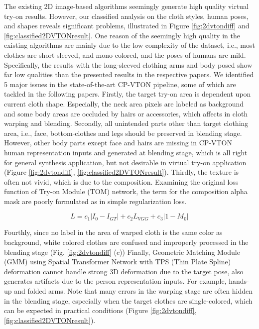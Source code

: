 The existing 2D image-based algorithms seemingly generate high quality virtual try-on results. However, our classified analysis on the cloth styles, human poses, and shapes reveals significant problems, illustrated in Figure \ref{fig:2dvtondiff} and \ref{fig:classified2DVTONresult}. One reason of the seemingly high quality in the existing algorithms are mainly due to the low complexity of the dataset, i.e., most clothes are short-sleeved, and mono-colored, and the poses of humans are mild. Specifically, the results with the long-sleeved clothing arms and body posed show far low qualities than the presented results in the respective papers\cite{Han2017VITONAI,Wang2018TowardCI}. We identified 5 major issues in the state-of-the-art CP-VTON\cite{Wang2018TowardCI} pipeline, some of which are tackled in the following papers\cite{Sun2019ImageBasedVT,Yu_2019_ICCV}. Firstly, the target try-on area is dependent upon current cloth shape. Especially, the neck area pixels are labeled as background and some body areas are occluded by hairs or accessories, which affects in cloth warping and blending. Secondly, all unintended parts other than target clothing area, i.e., face, bottom-clothes and legs should be preserved in blending stage. However, other body parts except face and hairs are missing in CP-VTON\cite{Wang2018TowardCI} human representation inputs and generated at blending stage, which is all right for general synthesis application, but not desirable in virtual try-on application (Figure \ref{fig:2dvtondiff}, \ref{fig:classified2DVTONresult}). Thirdly, the texture is often not vivid, which is due to the composition. Examining the original loss function of Try-on Module (TOM) network, the term for the composition alpha mask are poorly formulated as in simple regularization loss.   

\begin{equation}
L = c_1 | I_0-I_{GT} |+  c_2 L_{VGG}+c_3 |1-M_0 |        
\end{equation} 

Fourthly, since no label in the area of warped cloth is the same color as background, white colored clothes are confused and improperly processed in the blending stage (Fig. \ref{fig:2dvtondiff} (c))
Finally, Geometric Matching Module (GMM) using Spatial Transformer Network\cite{JaderbergSZK15} with TPS (Thin Plate Spline)\cite{Bookstein1989PrincipalWT} deformation cannot handle strong 3D deformation due to the target pose, also  generates artifacts due to the person representation inputs. For example, hands-up and folded arms.  Note that many errors in the warping stage are often hidden in the blending stage, especially when the target clothes are single-colored, which can be expected in practical conditions (Figure \ref{fig:2dvtondiff}, \ref{fig:classified2DVTONresult}).

